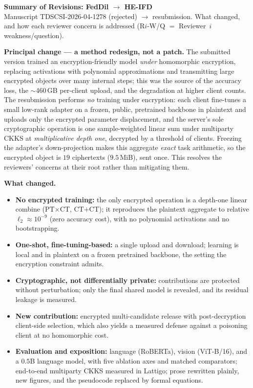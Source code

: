 \documentclass[10pt]{article}
\newcommand{\rc}[1]{\textbf{#1}}
\begin{document}
{\large\bfseries Summary of Revisions: FedDil $\rightarrow$ HE-IFD}\\[1pt]
{\footnotesize Manuscript TDSCSI-2026-04-1278 (rejected) $\rightarrow$ resubmission. What changed, and how each
reviewer concern is addressed (R$i$-W/Q $=$ Reviewer~$i$ weakness/question).}

\textbf{Principal change --- a method redesign, not a patch.} The submitted version trained an
encryption-friendly model \emph{under} homomorphic encryption, replacing activations with polynomial
approximations and transmitting large encrypted objects over many internal steps; this was the source of the
accuracy loss, the $\sim$460\,GB per-client upload, and the degradation at higher client counts. The
resubmission performs \emph{no} training under encryption: each client fine-tunes a small low-rank adapter on a
frozen, public, pretrained backbone in plaintext and uploads only the encrypted parameter displacement, and the
server's sole cryptographic operation is one sample-weighted linear sum under multiparty CKKS at
\emph{multiplicative depth one}, decrypted by a threshold of clients. Freezing the adapter's down-projection
makes this aggregate \emph{exact} task arithmetic, so the encrypted object is $19$ ciphertexts ($9.5$\,MiB),
sent once. This resolves the reviewers' concerns at their root rather than mitigating them.

\textbf{What changed.}
\begin{itemize}
\item \rc{No encrypted training:} the only encrypted operation is a depth-one linear combine (PT$\times$CT,
CT$+$CT); it reproduces the plaintext aggregate to relative $\ell_2\!\approx\!10^{-9}$ (zero accuracy cost),
with no polynomial activations and no bootstrapping.
\item \rc{One-shot, fine-tuning-based:} a single upload and download; learning is local and in plaintext on a
frozen pretrained backbone, the setting the encryption constraint admits.
\item \rc{Cryptographic, not differentially private:} contributions are protected without perturbation; only
the final shared model is revealed, and its residual leakage is measured.
\item \rc{New contribution:} encrypted multi-candidate release with post-decryption client-side selection,
which also yields a measured defense against a poisoning client at no homomorphic cost.
\item \rc{Evaluation and exposition:} language (RoBERTa), vision (ViT-B/16), and a $0.5$B language model, with
five ablation axes and matched comparators; end-to-end multiparty CKKS measured in Lattigo; prose rewritten
plainly, new figures, and the pseudocode replaced by formal equations.
\end{itemize}
\end{document}
